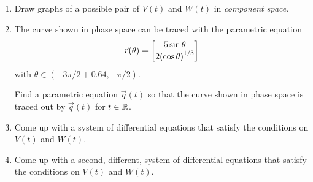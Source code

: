 \begin{enumerate}
		\begin{enumerate}
			\item Draw graphs of a possible pair of $V(t)$ and $W(t)$ in \emph{component space}.
			\item The curve shown in phase space can be traced with the parametric equation \[\vec r(\theta)=\begin{bmatrix}5\sin\theta \\ 2{(\cos\theta)}^{1/3}\end{bmatrix}\]
			with $\theta\in(-3\pi/2 + 0.64, -\pi/2)$.

			Find a parametric equation $\vec q(t)$ so that the curve shown in phase space is traced out by $\vec q(t)$ for $t\in \mathbb{R}$.

			\item Come up with a system of differential equations that satisfy the conditions on $V(t)$ and $W(t)$.

			\item Come up with a second, different, system of differential equations that satisfy the conditions on $V(t)$ and $W(t)$.
		\end{enumerate}






\end{enumerate}
